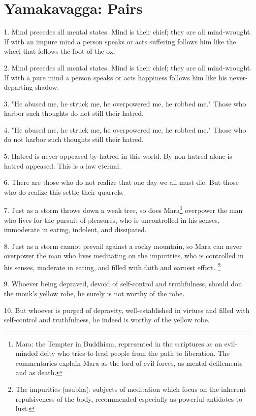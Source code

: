 \newpage
\chapter{Yamakavagga: Pairs}

1. Mind precedes all mental states. Mind is their chief; they are all mind-wrought. If with an impure mind a person speaks or acts suffering follows him like the wheel that follows the foot of the ox.

2. Mind precedes all mental states. Mind is their chief; they are all mind-wrought. If with a pure mind a person speaks or acts happiness follows him like his never-departing shadow.

3. "He abused me, he struck me, he overpowered me, he robbed me." Those who harbor such thoughts do not still their hatred.

4. "He abused me, he struck me, he overpowered me, he robbed me." Those who do not harbor such thoughts still their hatred.

5. Hatred is never appeased by hatred in this world. By non-hatred alone is hatred appeased. This is a law eternal.

6. There are those who do not realize that one day we all must die. But those who do realize this settle their quarrels.

7. Just as a storm throws down a weak tree, so does \Gls{Mara}\footnote{Mara: the Tempter in Buddhism, represented in the scriptures as an evil-minded deity who tries to lead people from the path to liberation. The commentaries explain Mara as the lord of evil forces, as mental defilements and as death.} overpower the man who lives for the pursuit of pleasures, who is uncontrolled in his senses, immoderate in eating, indolent, and dissipated.

8. Just as a storm cannot prevail against a rocky mountain, so Mara can never overpower the man who lives meditating on the impurities, who is controlled in his senses, moderate in eating, and filled with faith and earnest effort. \footnote{The impurities (asubha): subjects of meditation which focus on the inherent repulsiveness of the body, recommended especially as powerful antidotes to lust.}

9. Whoever being depraved, devoid of self-control and truthfulness, should don the monk's yellow robe, he surely is not worthy of the robe.

10. But whoever is purged of depravity, well-established in virtues and filled with self-control and truthfulness, he indeed is worthy of the yellow robe.

